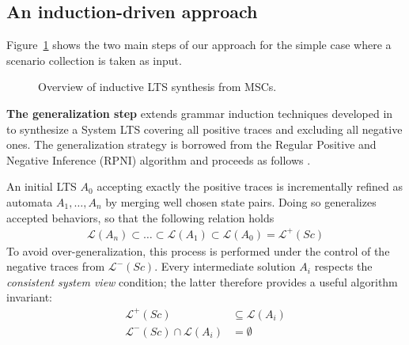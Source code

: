 
\subsection{An induction-driven approach\label{subsection:inductive-synthesis-approach}}

Figure~\ref{image:inductive-synthesis-overview} shows the two main steps of our approach for the simple case where a scenario collection is taken as input. 

\begin{figure}[H]\centering
  \caption{Overview of inductive LTS synthesis from MSCs.\label{image:inductive-synthesis-overview}}
\end{figure}

\noindent \textbf{The generalization step} extends grammar induction techniques developed in \cite{Oncina:1992} to synthesize a System LTS covering all positive traces and excluding all negative ones. The generalization strategy is borrowed from the Regular Positive and Negative Inference (RPNI) algorithm and proceeds as follows \cite{Oncina:1992}.

An initial LTS $A_0$ accepting exactly the positive traces is incrementally refined as automata $A_1,\ldots,A_n$ by merging well chosen state pairs. Doing so generalizes accepted behaviors, so that the following relation holds
\begin{align*}
\mathcal{L}(A_n) \subset \ldots \subset \mathcal{L}(A_1) \subset \mathcal{L}(A_0) = \mathcal{L}^+(Sc)
\end{align*}
To avoid over-generalization, this process is performed under the control of the negative traces from $\mathcal{L}^-(Sc)$. Every intermediate solution $A_i$ respects the \emph{consistent system view} condition; the latter therefore provides a useful algorithm invariant:
\begin{align*}
\mathcal{L}^+(Sc) & \subseteq \mathcal{L}(A_i) \\
\mathcal{L}^-(Sc) \cap \mathcal{L}(A_i) &= \emptyset
\end{align*}

